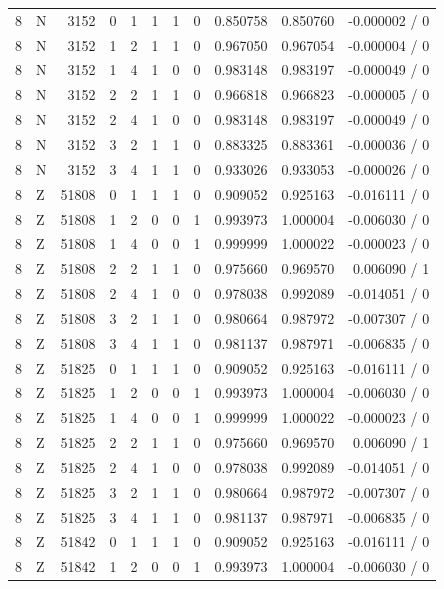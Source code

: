 \begin{longtable}{@{}rlrrlrrrrrr@{}}
8 & N & 3152 & 0 & 1 & 1 & 1 & 0 & 0.850758 & 0.850760 & -0.000002 / 0 \\
8 & N & 3152 & 1 & 2 & 1 & 1 & 0 & 0.967050 & 0.967054 & -0.000004 / 0 \\
8 & N & 3152 & 1 & 4 & 1 & 0 & 0 & 0.983148 & 0.983197 & -0.000049 / 0 \\
8 & N & 3152 & 2 & 2 & 1 & 1 & 0 & 0.966818 & 0.966823 & -0.000005 / 0 \\
8 & N & 3152 & 2 & 4 & 1 & 0 & 0 & 0.983148 & 0.983197 & -0.000049 / 0 \\
8 & N & 3152 & 3 & 2 & 1 & 1 & 0 & 0.883325 & 0.883361 & -0.000036 / 0 \\
8 & N & 3152 & 3 & 4 & 1 & 1 & 0 & 0.933026 & 0.933053 & -0.000026 / 0 \\
8 & Z & 51808 & 0 & 1 & 1 & 1 & 0 & 0.909052 & 0.925163 & -0.016111 / 0 \\
8 & Z & 51808 & 1 & 2 & 0 & 0 & 1 & 0.993973 & 1.000004 & -0.006030 / 0 \\
8 & Z & 51808 & 1 & 4 & 0 & 0 & 1 & 0.999999 & 1.000022 & -0.000023 / 0 \\
8 & Z & 51808 & 2 & 2 & 1 & 1 & 0 & 0.975660 & 0.969570 & 0.006090 / 1 \\
8 & Z & 51808 & 2 & 4 & 1 & 0 & 0 & 0.978038 & 0.992089 & -0.014051 / 0 \\
8 & Z & 51808 & 3 & 2 & 1 & 1 & 0 & 0.980664 & 0.987972 & -0.007307 / 0 \\
8 & Z & 51808 & 3 & 4 & 1 & 1 & 0 & 0.981137 & 0.987971 & -0.006835 / 0 \\
8 & Z & 51825 & 0 & 1 & 1 & 1 & 0 & 0.909052 & 0.925163 & -0.016111 / 0 \\
8 & Z & 51825 & 1 & 2 & 0 & 0 & 1 & 0.993973 & 1.000004 & -0.006030 / 0 \\
8 & Z & 51825 & 1 & 4 & 0 & 0 & 1 & 0.999999 & 1.000022 & -0.000023 / 0 \\
8 & Z & 51825 & 2 & 2 & 1 & 1 & 0 & 0.975660 & 0.969570 & 0.006090 / 1 \\
8 & Z & 51825 & 2 & 4 & 1 & 0 & 0 & 0.978038 & 0.992089 & -0.014051 / 0 \\
8 & Z & 51825 & 3 & 2 & 1 & 1 & 0 & 0.980664 & 0.987972 & -0.007307 / 0 \\
8 & Z & 51825 & 3 & 4 & 1 & 1 & 0 & 0.981137 & 0.987971 & -0.006835 / 0 \\
8 & Z & 51842 & 0 & 1 & 1 & 1 & 0 & 0.909052 & 0.925163 & -0.016111 / 0 \\
8 & Z & 51842 & 1 & 2 & 0 & 0 & 1 & 0.993973 & 1.000004 & -0.006030 / 0 \\

\end{longtable}
